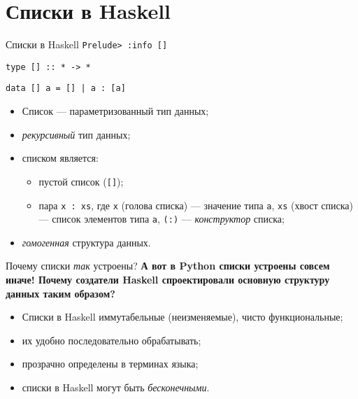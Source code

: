\documentclass{beamer}
\begin{document}
  \section{Списки в Haskell}
  \begin{frame}{Списки в Haskell}
      \texttt{Prelude> :info []}
      
      \pause
      
      \texttt{type [] :: * -> *}

      \texttt{data [] a = [] | a : [a]}
      
      \pause 
      \begin{itemize}
          \item Список --- параметризованный тип данных;
          \item \pause \textit{рекурсивный} тип данных;
          \item \pause списком является:
            \begin{itemize}
                \item пустой список (\texttt{[]});
                \item пара \texttt{x : xs}, где \texttt{x} (голова списка) --- значение типа \texttt{a}, \texttt{xs} (хвост списка) --- список элементов типа \texttt{a}, \texttt{(:)} --- \textit{конструктор} списка;
            \end{itemize}
          \item \pause \textit{гомогенная} структура данных.
      \end{itemize}
  \end{frame}
  \begin{frame}{Почему списки \textit{так} устроены?}
      \textbf{А вот в Python списки устроены совсем иначе! Почему создатели Haskell спроектировали основную структуру данных таким образом?}
      
      \pause
      
      \begin{itemize}
          \item Списки в Haskell иммутабельные (неизменяемые), чисто функциональные;
          \item их удобно последовательно обрабатывать;
          \item прозрачно определены в терминах языка;
          \item списки в Haskell могут быть \textit{бесконечными}.
      \end{itemize}
  \end{frame}
\end{document}
